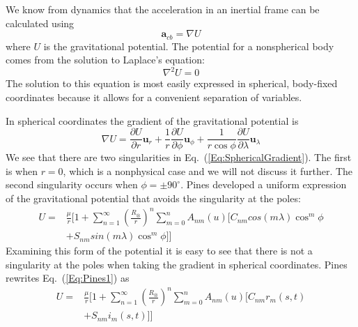 We know from dynamics that the acceleration in an inertial frame
can be calculated using
%
\begin{equation}
   \mathbf{a}_{cb} = \nabla U \label{Eq:a_cb}
\end{equation}
%
where $U$ is the gravitational potential.  The potential for a
nonspherical body comes from the solution to Laplace's equation:
%
\begin{equation}
     \nabla^2 U= 0
\end{equation}
%
The solution to this equation is most easily expressed in spherical,
body-fixed coordinates because it allows for a convenient separation
of variables.

In spherical coordinates the gradient of the gravitational potential
is
%
\begin{equation}
   \nabla U = \frac{\partial U}{\partial r}\mathbf{u}_r +
   \frac{1}{r}\frac{\partial U}{\partial \phi} \mathbf{u}_\phi
   + \frac{1}{r \cos{\phi}}\frac{\partial U}{\partial
   \lambda}\mathbf{u}_\lambda \label{Eq:SphericalGradient}
\end{equation}
%
We see that there are two singularities in
Eq.~(\ref{Eq:SphericalGradient}).  The first is when $r = 0$, which
is a nonphysical case and we will not discuss it further.  The
second singularity occurs when $ \phi = \pm 90^\circ$.  Pines
\cite{Pines:73} developed a uniform expression of the gravitational
potential that avoids the singularity at the poles:
%
\begin{equation}\begin{split}
    U = & \frac{\mu}{r}  \biggl[   1 + \sum_{n=1}^\infty \left(\frac{R_{\otimes}}{r}\right)^n
    \sum_{m=0}^{n} A_{nm}(u)[C_{nm} cos{(m \lambda)} \cos^m{\phi} \\
    & +S_{nm}sin{(m \lambda)} \cos^m{\phi} ]    \biggr]\end{split}
    \label{Eq:Pines1}
\end{equation}
%
Examining this form of the potential it is easy to see that there is
not a singularity at the poles when taking the gradient in spherical
coordinates.  Pines rewrites Eq.~(\ref{Eq:Pines1}) as
%
\begin{equation}\begin{split}
    U = & \frac{\mu}{r}  \biggl[   1 + \sum_{n=1}^\infty \left(\frac{R_{\otimes}}{r}\right)^n
    \sum_{m=0}^{n} A_{nm}(u)[C_{nm} r_m(s,t) \\
    & +S_{nm} i_m(s,t) ]    \biggr]\end{split}
    \label{Eq:PinesPotential}
\end{equation}
